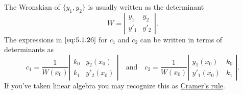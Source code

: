 \documentclass{ximera}
\begin{document}
The Wronskian of  $\{y_1,y_2\}$ is usually written as the determinant
$$
W=\left| \begin{array}{cc}
y_1 & y_2 \\
y'_1 & y'_2
\end{array} \right|.
$$
 The expressions in $\eqref{eq:5.1.26}$ for $c_1$ and $c_2$ can
be written in terms of determinants as
$$
c_1=\frac{1}{W(x_0)}
\left| \begin{array}{cc}
k_0 & y_2(x_0) \\
k_1 & y'_2(x_0)
\end{array} \right|
\quad\mbox{and}\quad
c_2=\frac{1}{W(x_0)}
\left| \begin{array}{cc}
y_1(x_0) & k_0 \\
y'_1(x_0) &k_1
\end{array} \right|.
$$
If you've taken linear algebra you may recognize this as
\href{https://en.wikipedia.org/wiki/Cramer%27s_rule}{Cramer's rule}.
 
\end{document}
